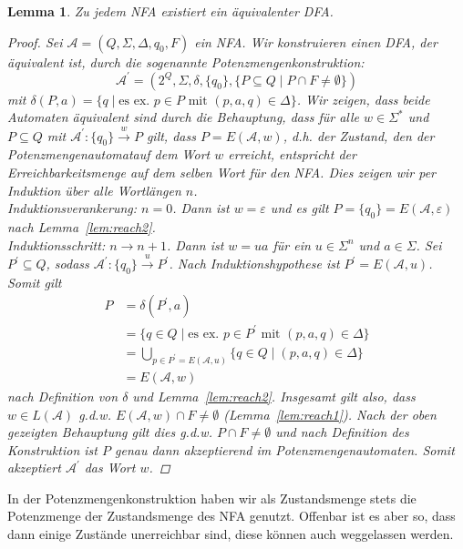\documentclass[11pt, a4paper]{article}
\theoremstyle{definition}
\theoremstyle{plain}
\newtheorem{lemma}[definition]{Lemma}
\numberwithin{equation}{section}
\newcommand{\reaches}[1]{\overset{#1}{\rightarrow}}
\begin{document}
\begin{lemma}\label{lem:nfa2dfa}
	Zu jedem NFA existiert ein äquivalenter DFA.
	\begin{proof}
		Sei \( \mathcal{A} = (Q, \Sigma, \Delta, q_0, F) \) ein NFA. Wir konstruieren einen DFA, der äquivalent ist, durch die sogenannte \textit{Potenzmengenkonstruktion}:
		\[
			\mathcal{A}^\prime = (2^Q, \Sigma, \delta, \{q_0\}, \{ P \subseteq Q \mid P \cap F \neq \emptyset \})
		\]
		mit \( \delta(P, a) = \{ q \mid \text{es ex. } p \in P \text{ mit } (p, a, q) \in \Delta \} \).
		Wir zeigen, dass beide Automaten äquivalent sind durch die Behauptung, dass für alle \( w \in \Sigma^\ast \) und \( P \subseteq Q \) mit \( \mathcal{A}^\prime: \{q_0\} \reaches{w} P \) gilt, dass \( P = E(\mathcal{A}, w) \), d.h. der Zustand, den der Potenzmengenautomatauf dem Wort \( w \) erreicht, entspricht der Erreichbarkeitsmenge auf dem selben Wort für den NFA. Dies zeigen wir per Induktion über alle Wortlängen \( n \).\\
		Induktionsverankerung: \( n = 0 \). Dann ist \( w = \varepsilon \) und es gilt \( P = \{q_0\} = E(\mathcal{A}, \varepsilon) \) nach Lemma~\ref{lem:reach2}.\\
		Induktionsschritt: \( n \rightarrow {n+1} \). Dann ist \( w = ua \) für ein \( u \in \Sigma^n \) und \( a \in \Sigma \). Sei \( P^\prime \subseteq Q \), sodass \( \mathcal{A}^\prime: \{q_0\} \reaches{u} P^\prime \). Nach Induktionshypothese ist \( P^\prime = E(\mathcal{A}, u) \). Somit gilt
		\begin{align*}
			P &= \delta(P^\prime, a)\\
			&= \{q \in Q \mid \text{es ex. } p \in P^\prime \text{ mit } (p, a, q) \in \Delta\}\\
			&= \bigcup_{p \in P^\prime = E(\mathcal{A}, u)} \{q \in Q \mid (p, a, q) \in \Delta\}\\
			&= E(\mathcal{A}, w)
		\end{align*}
		nach Definition von \( \delta \) und Lemma~\ref{lem:reach2}. Insgesamt gilt also, dass \( w \in L(\mathcal{A}) \) {g.d.w.} \( E(\mathcal{A}, w) \cap F \neq \emptyset \) (Lemma~\ref{lem:reach1}). Nach der oben gezeigten Behauptung gilt dies {g.d.w.} \( P \cap F \neq \emptyset \) und nach Definition des Konstruktion ist \( P \) genau dann akzeptierend im Potenzmengenautomaten. Somit akzeptiert \( \mathcal{A}^\prime \) das Wort \( w \).
	\end{proof}
\end{lemma}
In der Potenzmengenkonstruktion haben wir als Zustandsmenge stets die Potenzmenge der Zustandsmenge des NFA genutzt. Offenbar ist es aber so, dass dann einige Zustände unerreichbar sind, diese können auch weggelassen werden.
\end{document}
